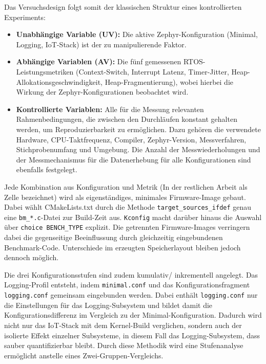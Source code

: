 Das Versuchsdesign folgt somit der klassischen Struktur eines kontrollierten Experiments:

\begin{itemize}
\item \textbf{Unabh{\"a}ngige Variable (UV):} Die aktive Zephyr-Konfiguration (Minimal, Logging, IoT-Stack) ist der zu manipulierende Faktor.
\item \textbf{Abh{\"a}ngige Variablen (AV):} Die f{\"u}nf gemessenen RTOS-Leistungsmetriken (Context-Switch, Interrupt Latenz, Timer-Jitter, Heap-Allokationsgeschwindigkeit, Heap-Fragmentierung), wobei hierbei die Wirkung der Zephyr-Konfigurationen beobachtet wird.
\item \textbf{Kontrollierte Variablen:} Alle f{\"u}r die Messung relevanten Rahmenbedingungen, die zwischen den Durchl{\"a}ufen konstant gehalten werden, um Reproduzierbarkeit zu erm{\"o}glichen. Dazu geh{\"o}ren die verwendete Hardware, CPU-Taktfrequenz, Compiler, Zephyr-Version, Messverfahren, Stichprobenumfang und Umgebung. Die Anzahl der Messwiederholungen und der Messmechanismus f{\"u}r die Datenerhebung f{\"u}r alle Konfigurationen sind ebenfalls festgelegt.
\end{itemize}
Jede Kombination aus Konfiguration und Metrik (In der restlichen Arbeit als \glqq{}Zelle\grqq{} bezeichnet) wird als eigenst{\"a}ndiges, minimales Firmware-Image gebaut. Dabei w{\"a}hlt CMakeLists.txt durch die Methode \lstinline[style=fileinline]|target_sources_ifdef| genau eine \lstinline[style=fileinline]|bm_*.c|-Datei zur Build-Zeit aus. \lstinline[style=fileinline]|Kconfig| macht dar{\"u}ber hinaus die Auswahl {\"u}ber \lstinline[style=fileinline]|choice BENCH_TYPE| explizit. Die getrennten Firmware-Images verringern dabei die gegenseitige Beeinflussung durch gleichzeitig eingebundenen Benchmark-Code. Unterschiede im erzeugten Speicherlayout bleiben jedoch dennoch m{\"o}glich.

Die drei Konfigurationsstufen sind zudem kumulativ/ inkrementell angelegt. Das Logging-Profil entsteht, indem \lstinline[style=fileinline]|minimal.conf| und das Konfigurationsfragment \lstinline[style=fileinline]|logging.conf| gemeinsam eingebunden werden. Dabei enth{\"a}lt \lstinline[style=fileinline]|logging.conf| nur die Einstellungen f{\"u}r das Logging-Subsystem und bildet damit die Konfigurationsdifferenz im Vergleich zu der Minimal-Konfiguration. Dadurch wird nicht nur das IoT-Stack mit dem Kernel-Build verglichen, sondern auch der isolierte Effekt einzelner Subsysteme, in diesem Fall das Logging-Subsystem, dass sauber quantifizierbar bleibt. Durch diese Methodik wird eine Stufenanalyse erm{\"o}glicht anstelle eines Zwei-Gruppen-Vergleichs.

